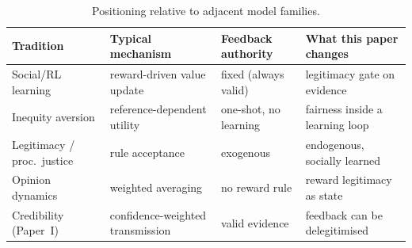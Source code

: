 \begin{table}[t]\centering\small
\caption{Positioning relative to adjacent model families.}
\label{tab:comparison}
\begin{tabular}{p{3.0cm}p{3.3cm}p{2.7cm}p{3.4cm}}\toprule
Tradition & Typical mechanism & Feedback authority & What this paper changes \\ \midrule
Social/RL learning & reward-driven value update & fixed (always valid) & legitimacy gate on evidence \\
Inequity aversion & reference-dependent utility & one-shot, no learning & fairness inside a learning loop \\
Legitimacy / proc.\ justice & rule acceptance & exogenous & endogenous, socially learned \\
Opinion dynamics & weighted averaging & no reward rule & reward legitimacy as state \\
Credibility (Paper~I) & confidence-weighted transmission & valid evidence & feedback can be delegitimised \\
\bottomrule\end{tabular}
\end{table}
